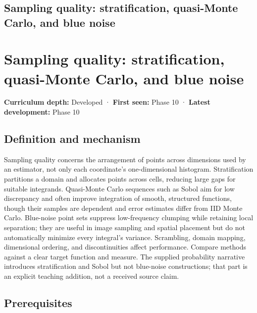 \hypertarget{appendix-9f693ffd82bc}{}
\section*{Sampling quality: stratification, quasi-Monte Carlo, and blue noise}
\chapter{Sampling quality: stratification, quasi-Monte Carlo, and blue noise}\label{appendix-9f693ffd82bc-sampling-quality-stratification-quasi-monte-carlo-and-blue-noise}

\textbf{Curriculum depth:} Developed · \textbf{First seen:} Phase 10 · \textbf{Latest development:} Phase 10

\section{Definition and mechanism}\label{appendix-9f693ffd82bc-definition-and-mechanism}

Sampling quality concerns the arrangement of points across dimensions used by an estimator, not only each coordinate's one-dimensional histogram. Stratification partitions a domain and allocates points across cells, reducing large gaps for suitable integrands. Quasi-Monte Carlo sequences such as Sobol aim for low discrepancy and often improve integration of smooth, structured functions, though their samples are dependent and error estimates differ from IID Monte Carlo. Blue-noise point sets suppress low-frequency clumping while retaining local separation; they are useful in image sampling and spatial placement but do not automatically minimize every integral's variance. Scrambling, domain mapping, dimensional ordering, and discontinuities affect performance. Compare methods against a clear target function and measure. The supplied probability narrative introduces stratification and Sobol but not blue-noise constructions; that part is an explicit teaching addition, not a received source claim.

\section{Prerequisites}\label{appendix-9f693ffd82bc-prerequisites}

